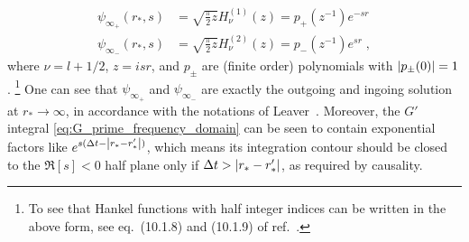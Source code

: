 \documentclass[reprint,aps,physrev,superscriptaddress,10pt,notitlepage,prd,nofootinbib,onecolumn]{revtex4-2}
\begin{document}
\begin{align}
  \label{eq:psi_pm_via_Hankel}
  \psi_{\infty_+}(r_*, s)
  &= \sqrt{\frac{\pi}{2} z} H_\nu^{(1)}(z)
  = p_+(z^{-1}) e^{-sr} \nonumber \\
  \psi_{\infty_-}(r_*, s)
  &= \sqrt{\frac{\pi}{2} z} H_\nu^{(2)}(z)
  =  p_-(z^{-1}) e^{sr} \;,
\end{align}
where $\nu = l+1/2$, $z=isr$, and $p_\pm$ are (finite order) polynomials with $\abs{p_\pm(0)} = 1$.
\footnote{To see that Hankel functions with half integer indices can be written in the above form, see eq.~(10.1.8) and (10.1.9) of ref.~\cite{abramowitz+stegun}.}
One can see that $\psi_{\infty_+}$ and $\psi_{\infty_-}$ are exactly the outgoing and ingoing solution at $r_* \to \infty$, in accordance with the notations of Leaver~\cite{Leaver:1986gd}.
Moreover, the $G'$ integral \eqref{eq:G_prime_frequency_domain} can be seen to contain exponential factors like $e^{s(\Delta{t} - \abs{r_* - r_*'})}$, which means its integration contour should be closed to the $\Re[s] < 0$ half plane only if $\Delta{t} > \abs{r_* - r_*'}$, as required by causality.
\end{document}
